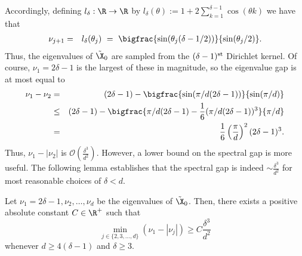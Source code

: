 Accordingly, defining $l_\delta : \R \to \R$ by $l_\delta(\theta) := 1 + 2\sum_{k=1}^{\delta - 1} \cos(\theta k)$ we have that
\begin{eqnarray}
  \nu_{j+1} %
  & = & l_\delta(\theta_j) ~=~ \bigfrac{\sin(\theta_j(\delta - 1/2))}{\sin(\theta_j / 2)}. \label{equ:EigenFormula}
\end{eqnarray}
Thus, the eigenvalues of $\tilde{\X}_0$ are sampled from the $(\delta-1)^{\rm st}$ Dirichlet kernel.  
Of course, $\nu_1 = 2\delta - 1$ is the largest of these in magnitude, so the eigenvalue gap is at most equal to
\begin{eqnarray*}
  \nu_1 - \nu_2 & = & (2\delta -  1) - \bigfrac{\sin(\pi / d (2\delta - 1))}{\sin(\pi / d)} \\
  & \le & (2 \delta - 1) - \bigfrac{\pi / d(2 \delta - 1) - \frac{1}{6}(\pi / d (2 \delta - 1))^3}{\pi / d} \\
  & = & \frac{1}{6}\left(\frac{\pi}{d}\right)^2(2 \delta - 1)^3 \label{equ:gap12}.
\end{eqnarray*}
Thus, $\nu_1 - |\nu_2 |$ is $\mathcal{O}\left(\frac{\delta^3}{d^2} \right)$.  However, a lower bound on the spectral gap is more useful.  The following lemma establishes that the spectral gap is indeed $\sim \frac{\delta^3}{d^2}$ for most reasonable choices of $\delta < d$.

\begin{lem}
Let $\nu_1 = 2 \delta -1, \nu_2, \dots, \nu_d$ be the eigenvalues of $\tilde{\X}_0$.  Then, there exists a positive absolute constant $C \in \R^+$ such that
$$\min_{j \in \{2, 3, \dots, d \} } (\nu_1 - |\nu_j| ) \geq C \frac{\delta^3}{d^2}$$
whenever $d \geq 4(\delta - 1)$ and $\delta \geq 3$. %
\label{lem:EigGap}
\end{lem}

